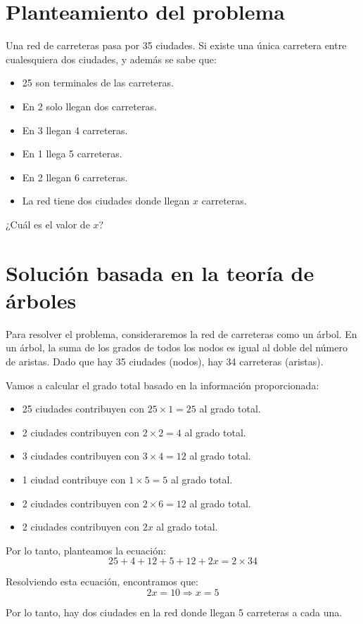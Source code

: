 \documentclass{article}
\begin{document}
\section{Planteamiento del problema}
Una red de carreteras pasa por 35 ciudades. Si existe una única carretera entre cualesquiera dos ciudades, y además se sabe que:
\begin{itemize}
    \item 25 son terminales de las carreteras.
    \item En 2 solo llegan dos carreteras.
    \item En 3 llegan 4 carreteras.
    \item En 1 llega 5 carreteras.
    \item En 2 llegan 6 carreteras.
    \item La red tiene dos ciudades donde llegan $x$ carreteras.
\end{itemize}
¿Cuál es el valor de $x$?

\section{Solución basada en la teoría de árboles}
Para resolver el problema, consideraremos la red de carreteras como un árbol. En un árbol, la suma de los grados de todos los nodos es igual al doble del número de aristas. Dado que hay 35 ciudades (nodos), hay 34 carreteras (aristas). 

Vamos a calcular el grado total basado en la información proporcionada:
\begin{itemize}
    \item 25 ciudades contribuyen con $25 \times 1 = 25$ al grado total.
    \item 2 ciudades contribuyen con $2 \times 2 = 4$ al grado total.
    \item 3 ciudades contribuyen con $3 \times 4 = 12$ al grado total.
    \item 1 ciudad contribuye con $1 \times 5 = 5$ al grado total.
    \item 2 ciudades contribuyen con $2 \times 6 = 12$ al grado total.
    \item 2 ciudades contribuyen con $2x$ al grado total.
\end{itemize}

Por lo tanto, planteamos la ecuación:
\[
25 + 4 + 12 + 5 + 12 + 2x = 2 \times 34
\]

Resolviendo esta ecuación, encontramos que:
\[
2x = 10 \Rightarrow x = 5
\]

Por lo tanto, hay dos ciudades en la red donde llegan 5 carreteras a cada una.
\end{document}
